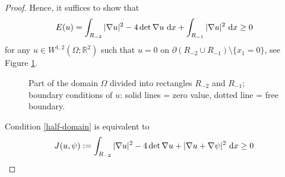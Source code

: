 \documentclass[12pt]{amsart}
\newcommand{\md}{{\rm d}}
\newcommand{\dx}{\, \md x}
\newcommand{\R}{\mathbb{R}}
\newcommand{\om}{\Omega}
\newcommand{\1}{{\bf 1}}
\begin{document}
\begin{proof}

Hence, it suffices to show that     
\begin{align}\label{half-domain}
   E(u)= \int_{R_{-2}} |\nabla u|^2 -4 \det\nabla u\,\dx +\int_{R_{-1}}|\nabla u |^2\,\dx\ge 0 
\end{align}    
for any $u\in W^{1,2}(\om;\R^2)$ such that $u=0$ on  $\partial(R_{-2}\cup R_{-1})\setminus\{x_1=0\}$, see Figure \ref{pic:pureinsulation_reduced}.
\begin{figure}[H]
\centering
\begin{minipage}{0.69\textwidth}
\centering
{}
\end{minipage}
\caption{Part of the domain $\Omega$ divided into rectangles \( R_{-2} \) and \( R_{-1} \); boundary conditions of \(u\): solid lines = zero value, dotted line = free boundary.}
\label{pic:pureinsulation_reduced}
\end{figure}

Condition \eqref{half-domain} is equivalent to 
$$
J(u,\psi):= \int_{R_{-2}} |\nabla u|^2 -4 \det\nabla u +|\nabla u+\nabla\psi|^2\,\dx \ge 0 $$


\end{proof}
\end{document}
